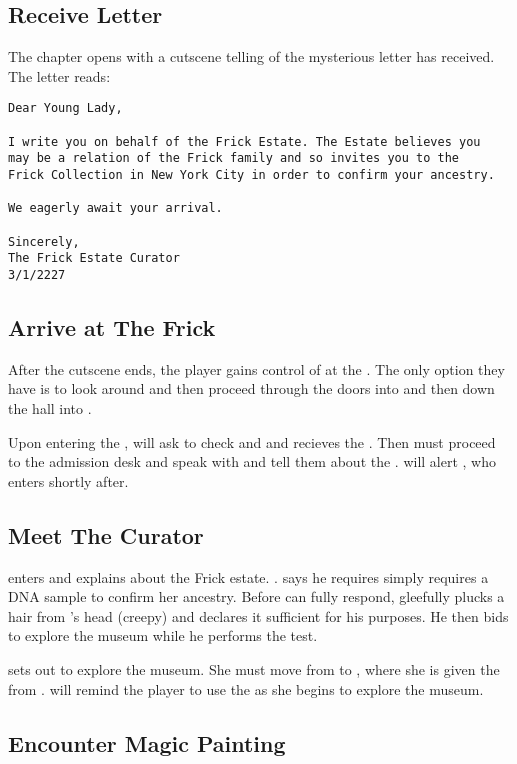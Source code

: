 \documentclass{article}
\begin{document}
\subsection{Receive Letter}
The chapter opens with a cutscene telling of the mysterious letter \cyl{} has received. The letter reads:
\begin{verbatim}
Dear Young Lady,

I write you on behalf of the Frick Estate. The Estate believes you
may be a relation of the Frick family and so invites you to the
Frick Collection in New York City in order to confirm your ancestry.

We eagerly await your arrival.

Sincerely,
The Frick Estate Curator
3/1/2227
\end{verbatim}
\subsection{Arrive at The Frick}
After the cutscene ends, the player gains control of \cyl{} at the \rentrance{}. The only option they have is to look around and then proceed through the doors into \rentry{} and then down the hall into \rreception{}.

Upon entering the \rreception{}, \cbagchecker{} will ask \cyl{} to check \iylbag{} and \iylcoat{} and \cyl{} recieves the \ibagcheckstub{}. Then \cyl{} must proceed to the admission desk and speak with \cadmissions{} and tell them about the \ifrickestateletter{}. \cadmissions{} will alert \ccurator{}, who enters shortly after.
\subsection{Meet The Curator}
\ccurator{} enters and explains about the Frick estate. . \ccurator{} says he requires simply requires a DNA sample to confirm her ancestry. Before \cyl{} can fully respond, \ccurator{} gleefully plucks a hair from \cyl{}'s head (creepy) and declares it sufficient for his purposes. He then bids \cyl{} to explore the museum while he performs the test.

\cyl{} sets out to explore the museum. She must move from \rreception{} to \rentry{}, where she is given the \iaudioguide{} from \chelpdesk{}. \cyl{} will remind the player to use the \iaudioguide{} as she begins to explore the museum. 

\subsection{Encounter Magic Painting}
\end{document}
